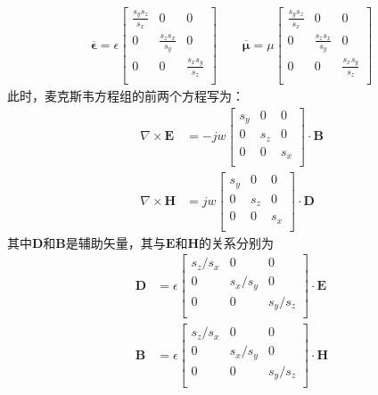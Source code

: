 \documentclass{article}
\numberwithin{equation}{section}
\renewcommand{\vec}[1]{\boldsymbol{#1}}
\begin{document}
\begin{align}
    \label{eq:eq647}
    \overline{\vec{\epsilon}}=\epsilon
        \left[
            \begin{matrix}
                \frac{s_ys_z}{s_x} & 0 & 0 \\
                0 & \frac{s_zs_x}{s_y} & 0 \\
                0 & 0 & \frac{s_xs_y}{s_z} \\
            \end{matrix}
        \right]
    \qquad
    \overline{\vec{\mu}}=\mu
    \left[
        \begin{matrix}
            \frac{s_ys_z}{s_x} & 0 & 0 \\
            0 & \frac{s_zs_x}{s_y} & 0 \\
            0 & 0 & \frac{s_xs_y}{s_z} \\
        \end{matrix}
    \right]
\end{align}
此时，麦克斯韦方程组的前两个方程写为：
\begin{align}
    \label{eq:eq648}
    \nabla\times\mathbf{E}&=-jw
        \left[
            \begin{matrix}
                s_y & 0 & 0 \\
                0 & s_z & 0 \\
                0 & 0 & s_x \\
            \end{matrix}
        \right]
    \cdot\mathbf{B} \\
    \label{eq:eq649}
    \nabla\times\mathbf{H}&=jw
    \left[
        \begin{matrix}
            s_y & 0 & 0 \\
            0 & s_z & 0 \\
            0 & 0 & s_x \\
        \end{matrix}
    \right]
    \cdot\mathbf{D}
\end{align}
其中$\mathbf{D}$和$\mathbf{B}$是辅助矢量，其与$\mathbf{E}$和$\mathbf{H}$的关系分别为
\begin{align}
    \label{eq:eq650}
    \mathbf{D}&=\epsilon
        \left[
            \begin{matrix}
                s_z/s_x & 0 & 0 \\
                0 & s_x/s_y & 0 \\
                0 & 0 & s_y/s_z \\
            \end{matrix}
        \right]
    \cdot\mathbf{E} \\
    \label{eq:eq651}
    \mathbf{B}&=\epsilon
        \left[
            \begin{matrix}
                s_z/s_x & 0 & 0 \\
                0 & s_x/s_y & 0 \\
                0 & 0 & s_y/s_z \\
            \end{matrix}
        \right]
    \cdot\mathbf{H}
\end{align}
\end{document}
